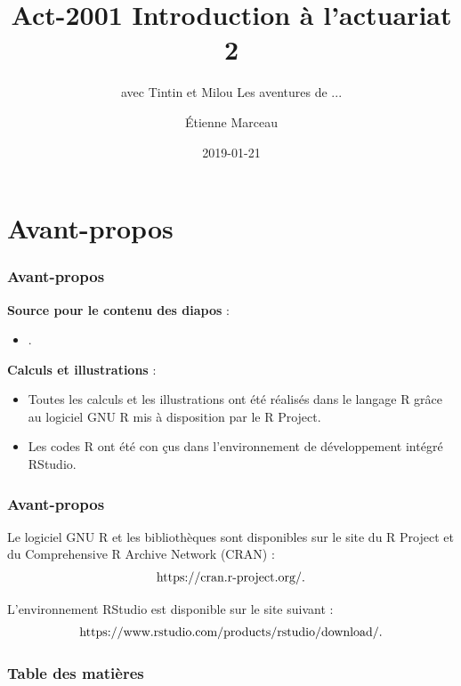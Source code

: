 \documentclass[11pt]{beamer}
\title[]{Act-2001 Introduction à l'actuariat 2}
\subtitle{\vspace{0.1in} avec Tintin et Milou \newline \newline Les aventures de  ...}
\author[Étienne M.]{Étienne Marceau}
\institute[École d'actuariat]
{
  École d'actuariat \\
  Université Laval, Québec, Canada \\
}
\date{2019-01-21} %
\begin{document}
\begin{frame}[label=titre, plain]
\titlepage
\end{frame}

\section{Avant-propos}

\begin{frame}
\frametitle{Avant-propos}

\textbf{Source pour le contenu des diapos} : 
\begin{itemize}
\item \cite{cossettemarceau2018document}.
\end{itemize} 


\bigskip

\textbf{Calculs et illustrations} :
\begin{itemize}
\item Toutes les calculs et les illustrations
ont \'{e}t\'{e} r\'{e}alis\'{e}s dans le langage R gr\^{a}ce au logiciel GNU
R mis \`{a} disposition par le R Project.
\item Les codes R ont \'{e}t\'{e} con%
\c{c}us dans l'environnement de d\'{e}veloppement int\'{e}gr\'{e} RStudio.
\end{itemize}

\end{frame}

\begin{frame}
\frametitle{Avant-propos}


Le logiciel GNU R et les biblioth\`{e}ques sont disponibles sur le site du R
Project et du Comprehensive R Archive Network (CRAN) : 
\begin{equation*}
\begin{tabular}{l}
https://cran.r-project.org/.%
\end{tabular}%
\end{equation*}

\bigskip

L'environnement RStudio est disponible sur le site suivant :%
\begin{equation*}
\begin{tabular}{l}
https://www.rstudio.com/products/rstudio/download/.%
\end{tabular}%
\end{equation*}


\end{frame}

\begin{frame}[allowframebreaks]
\frametitle{Table des matières}
\tableofcontents
\end{frame}
\end{document}
